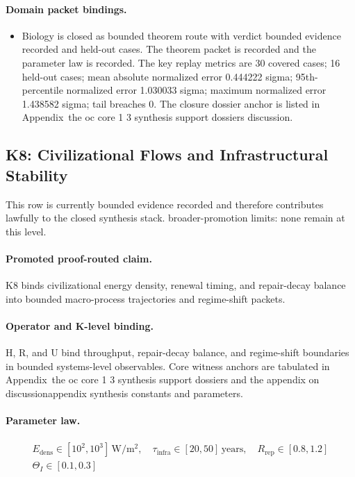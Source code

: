 \paragraph{Domain packet bindings.}
\begin{itemize}[leftmargin=1.6em,nosep]
\item Biology is closed as bounded theorem route with verdict bounded evidence recorded and  held-out cases. The theorem packet is recorded and the parameter law is recorded. The key replay metrics are 30 covered cases; 16 held-out cases; mean absolute normalized error 0.444222 sigma; 95th-percentile normalized error 1.030033 sigma; maximum normalized error 1.438582 sigma; tail breaches 0. The closure dossier anchor is listed in Appendix~the oc core 1 3 synthesis support dossiers discussion.
\end{itemize}

\subsection{K8: Civilizational Flows and Infrastructural Stability}
\label{sec:oc-core-1-3-synthesis-k8}
This row is currently bounded evidence recorded and therefore contributes lawfully to the closed synthesis stack.
broader-promotion limits: none remain at this level.

\paragraph{Promoted proof-routed claim.}
K8 binds civilizational energy density, renewal timing, and repair-decay balance into bounded macro-process trajectories and regime-shift packets.

\paragraph{Operator and K-level binding.}
H, R, and U bind throughput, repair-decay balance, and regime-shift boundaries in bounded systems-level observables.
Core witness anchors are tabulated in Appendix~the oc core 1 3 synthesis support dossiers and the appendix on discussionappendix synthesis constants and parameters.

\paragraph{Parameter law.}
\[
\begin{gathered} E_{\mathrm{dens}} \in [10^2,10^3]\,\mathrm{W/m^2},\quad \tau_{\mathrm{infra}} \in [20,50]\,\mathrm{years},\quad R_{\mathrm{rep}} \in [0.8,1.2] \\ \Theta_I \in [0.1,0.3] \end{gathered}
\]


